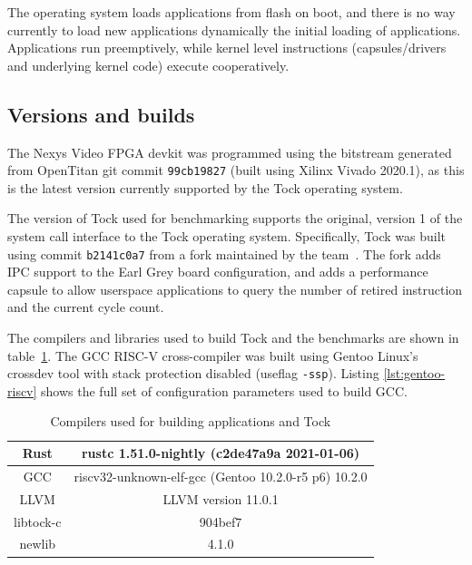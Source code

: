 \documentclass{article}
\begin{document}
The operating system loads applications from flash on boot, and there is no way currently to load new applications dynamically the initial loading of applications. Applications run preemptively, while kernel level instructions (capsules/drivers and underlying kernel code) execute cooperatively.

\subsection{Versions and builds} \label{subsec:versions}

The Nexys Video FPGA devkit was programmed using the bitstream generated from OpenTitan git commit \texttt{99cb19827} (built using Xilinx Vivado 2020.1), as this is the latest version currently supported by the Tock operating system.

The version of Tock used for benchmarking supports the original, version 1 of the system call interface to the Tock operating system. Specifically, Tock was built using commit \texttt{b2141c0a7} from a fork maintained by the team~\cite{team-tock}. The fork adds IPC support to the Earl Grey board configuration, and adds a performance capsule to allow userspace applications to query the number of retired instruction and the current cycle count.

The compilers and libraries used to build Tock and the benchmarks are shown in table~\ref{table:compilers}. The GCC RISC-V cross-compiler was built using Gentoo Linux's crossdev tool with stack protection disabled (useflag \texttt{-ssp}). Listing \ref{lst:gentoo-riscv} shows the full set of configuration parameters used to build GCC.

\begin{table}[H]
\centering
    \begin{tabular}{|c||c|}
        \hline
        Rust & rustc 1.51.0-nightly (c2de47a9a 2021-01-06) \\
        \hline
        GCC & riscv32-unknown-elf-gcc (Gentoo 10.2.0-r5 p6) 10.2.0 \\
        \hline
        LLVM & LLVM version 11.0.1 \\
        \hline
        libtock-c & 904bef7\cite{team-libtock-c} \\
        \hline
        newlib & 4.1.0 \\
        \hline
    \end{tabular}
\caption{Compilers used for building applications and Tock}
\label{table:compilers}
\end{table}
\end{document}
